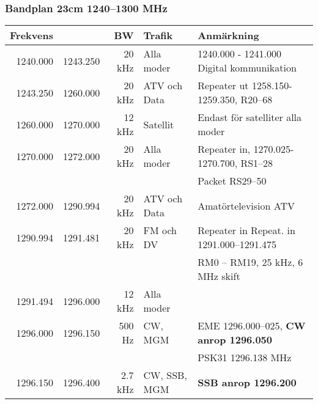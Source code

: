 \begin{landscape}
\subsubsection{Bandplan 23cm 1240--1300 MHz}
\begin{tabular}{rrrll}
	\textbf{Frekvens}         &               & \textbf{BW} & \textbf{Trafik} & \textbf{Anmärkning}                                          \\ \hline
	         1240.000         & 1243.250      & 20 kHz      & Alla moder      & 1240.000 - 1241.000 Digital kommunikation                    \\ \hline
	         1243.250         & 1260.000      & 20 kHz      & ATV och Data    & Repeater ut 1258.150-1259.350, R20--68                       \\ \hline
	         1260.000         & 1270.000      & 12 kHz      & Satellit        & Endast för satelliter alla moder                             \\ \hline
	         1270.000         & 1272.000      & 20 kHz      & Alla moder      & Repeater in, 1270.025-1270.700, RS1--28                      \\
                                  &               &             &                 & Packet RS29--50                                              \\ \hline
	         1272.000         & 1290.994      & 20 kHz      & ATV och Data    & Amatörtelevision ATV                                         \\ \hline
	         1290.994         & 1291.481      & 20 kHz      & FM och DV       & Repeater in Repeat. in 1291.000--1291.475                    \\
                                  &               &             &                 & RM0 – RM19, 25 kHz, 6 MHz skift                              \\ \hline
	         1291.494         & 1296.000      & 12 kHz      & Alla moder      &                                                              \\ \hline
	         1296.000         & 1296.150      & 500 Hz      & CW,  MGM        & EME 1296.000--025, \textbf{CW anrop 1296.050}                \\
                                  &               &             &                 & PSK31 1296.138 MHz                                           \\ \hline
	         1296.150         & 1296.400      & 2.7 kHz     & CW, SSB, MGM    & \textbf{SSB anrop 1296.200}                                  \\

\end{tabular}
\end{landscape}
